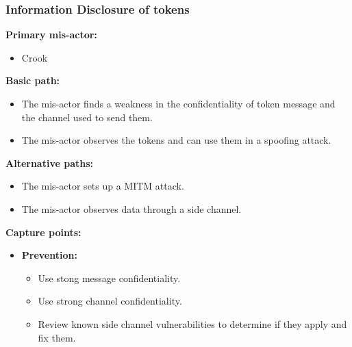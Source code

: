 \documentclass[a4paper,11pt]{report}
\begin{document}
\subsubsection{Information Disclosure of tokens}
\textbf{Primary mis-actor:}
\begin{itemize}
\item Crook
\end{itemize}
\textbf{Basic path:}
\begin{itemize}
\item The mis-actor finds a weakness in the confidentiality of token message and the channel used to send them.
\item The mis-actor observes the tokens and can use them in a spoofing attack.
\end{itemize}
\textbf{Alternative paths:}
\begin{itemize}
\item The mis-actor sets up a MITM attack.
\item The mis-actor observes data through a side channel.
\end{itemize}
\textbf{Capture points:}
\begin{itemize}
\item \textbf{Prevention:}
\begin{itemize}
\item Use stong message confidentiality.
\item Use strong channel confidentiality.
\item Review known side channel vulnerabilities to determine if they apply and fix them.
\end{itemize}
\end{itemize}
\end{document}
